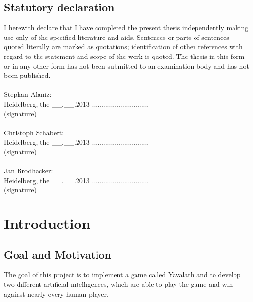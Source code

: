 \documentclass[english]{report}
\begin{document}
\section*{Statutory declaration}\thispagestyle{empty}
I herewith declare that I have completed the present thesis independently making use only of the specified literature and aids. Sentences or parts of sentences quoted literally are marked as quotations; identification of other references with regard to the statement and scope of the work is quoted. The thesis in this form or in any other form has not been submitted to an examination body and has not been published.\\
\\
Stephan Alaniz:\\
Heidelberg, the \_\_.\_\_.2013 \hspace{2.5cm} .............................. \\
\hspace*{6.5cm} (signature)\\
\\
Christoph Schabert:\\
Heidelberg, the \_\_.\_\_.2013 \hspace{2.5cm} .............................. \\
\hspace*{6.5cm} (signature)\\
\\
Jan Brodhacker:\\
Heidelberg, the \_\_.\_\_.2013 \hspace{2.5cm} .............................. \\
\hspace*{6.5cm} (signature)\\

\newpage
\setcounter{page}{1}



\tableofcontents

\listoffigures





\newpage

\chapter{Introduction}
\label{sec:chapter1}
\section{Goal and Motivation}
The goal of this project is to implement a game called Yavalath and to develop
two different artificial intelligences, which are able to play the game and win
against nearly every human player.
\end{document}
